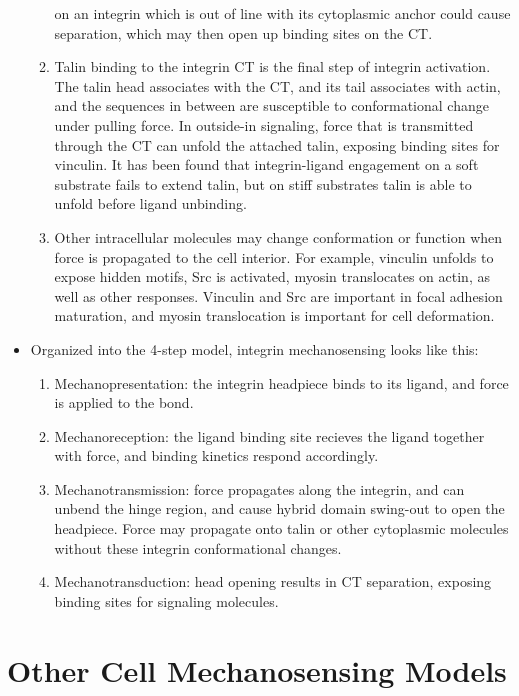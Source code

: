 \documentclass[
10pt, %
letterpaper, %
twocolumn, %
landscape %
]{article}
\newcommand{\inta}[1]{\textalpha\textsubscript{#1}}
\newcommand{\intb}[1]{\textbeta\textsubscript{#1}}
\begin{document}
\begin{itemize}
\begin{enumerate}
    on an integrin which is out of line with its cytoplasmic anchor
    could cause \inta{}\intb{} separation, which may then open up
    binding sites on the \intb{} CT.
  \item Talin binding to the integrin \intb{} CT is the final step of
    integrin activation. The talin head associates with the CT, and
    its tail associates with actin, and the sequences in between are
    susceptible to conformational change under pulling force. In
    outside-in signaling, force that is transmitted through the
    \intb{} CT can unfold the attached talin, exposing binding sites
    for vinculin. It has been found that integrin-ligand engagement on
    a soft substrate fails to extend talin, but on stiff substrates
    talin is able to unfold before ligand unbinding.
  \item Other intracellular molecules may change conformation or
    function when force is propagated to the cell interior. For
    example, vinculin unfolds to expose hidden motifs, Src is
    activated, myosin translocates on actin, as well as other
    responses. Vinculin and Src are important in focal adhesion
    maturation, and myosin translocation is important for cell
    deformation. 
  \end{enumerate}
\item Organized into the 4-step model, integrin mechanosensing looks
  like this:
  \begin{enumerate}
  \item Mechanopresentation: the integrin headpiece binds to its
    ligand, and force is applied to the bond.
  \item Mechanoreception: the ligand binding site recieves the ligand
    together with force, and binding kinetics respond accordingly. 
  \item Mechanotransmission: force propagates along the integrin, and
    can unbend the hinge region, and cause hybrid domain swing-out to
    open the headpiece. Force may propagate onto talin or other
    cytoplasmic molecules without these integrin conformational
    changes. 
  \item Mechanotransduction: head opening results in \inta{}\intb{} CT
    separation, exposing binding sites for signaling molecules. 
  \end{enumerate}
\end{itemize}


\section{Other Cell Mechanosensing Models}
\end{document}
